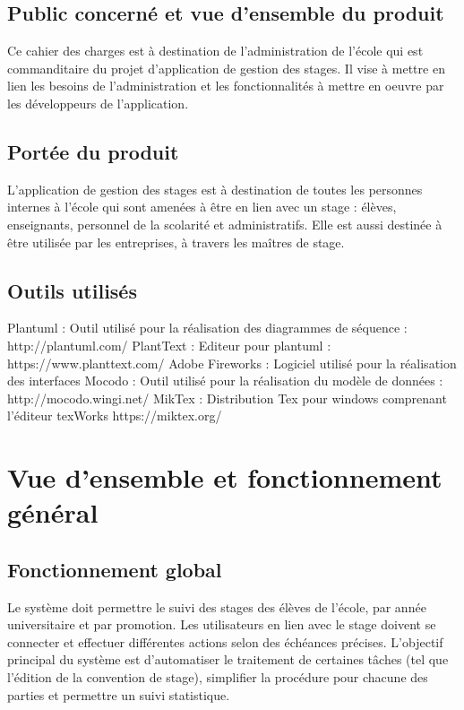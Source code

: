 \documentclass{scrreprt}
\begin{document}
\section{Public concerné et vue d’ensemble du produit}
Ce cahier des charges est à destination de l’administration de l’école qui est commanditaire du projet d’application de gestion des stages. Il vise à mettre en lien les besoins de l’administration et les fonctionnalités à mettre en oeuvre par les développeurs de l’application. 

\section{ Portée du produit}
L’application de gestion des stages est à destination de toutes les personnes internes à l’école qui sont amenées à être en lien avec un stage : élèves, enseignants, personnel de la scolarité et administratifs.
Elle est aussi destinée à être utilisée par les entreprises, à travers les maîtres de stage.


\section{Outils utilisés}
Plantuml : Outil utilisé pour la réalisation des diagrammes de séquence : http://plantuml.com/ 
PlantText : Editeur pour plantuml : https://www.planttext.com/
Adobe Fireworks : Logiciel utilisé pour la réalisation des interfaces
Mocodo :  Outil utilisé pour la réalisation du modèle de données : http://mocodo.wingi.net/
MikTex : Distribution Tex pour windows comprenant l’éditeur texWorks https://miktex.org/


\chapter{Vue d'ensemble et fonctionnement g\'en\'eral}

\section{Fonctionnement global}
Le système doit permettre le suivi des stages des élèves de l’école, par année universitaire et par promotion. Les utilisateurs en lien avec le stage doivent se connecter et effectuer différentes actions selon des échéances précises. L’objectif principal du système est d’automatiser le traitement de certaines tâches (tel que l’édition de la convention de stage), simplifier la procédure pour chacune des parties et permettre un suivi statistique.
\end{document}
